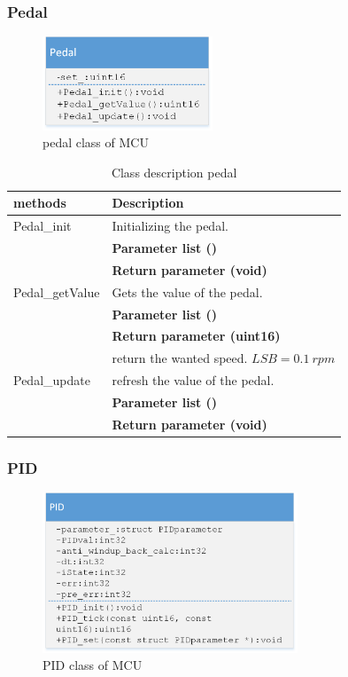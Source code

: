 \subsubsection{Pedal}

\begin{figure}[H]
	\centering
	\includegraphics [width=2in]{Software/Pictures/class-diagram-pedal.png}
	\caption{pedal class of MCU}
	\label{fig:Class_diagram_MCU_pedal}
\end{figure}

\begin{table}[H]
	\centering
	\begin{tabular}{|p{5 cm}|p{10 cm}|}
		\hline
		\textbf{methods} & \textbf{Description} \\ \hline
		
		Pedal\_init
		& Initializing the pedal.
		\\ & \textbf{Parameter list ()}
		\\ & \textbf{Return parameter (void)}
		\\ \hline
		
		Pedal\_getValue
		& Gets the value of the pedal.
		\\ & \textbf{Parameter list ()}
		\\ & \textbf{Return parameter (uint16)}
		\\ & return the wanted speed. $ LSB = \SI{0.1}{rpm} $
		\\ \hline
		
		Pedal\_update
		& refresh the value of the pedal. 
		\\ & \textbf{Parameter list ()}
		\\ & \textbf{Return parameter (void)}
		\\ \hline
		
	\end{tabular}
	\caption{Class description pedal}
	\label{table:Class_description_MCU_pedal}
\end{table}

\subsubsection{PID}

\begin{figure}[H]
	\centering
	\includegraphics [width=3in]{Software/Pictures/class-diagram-PID.png}
	\caption{PID class of MCU}
	\label{fig:Class_diagram_MCU_PID}
\end{figure}

